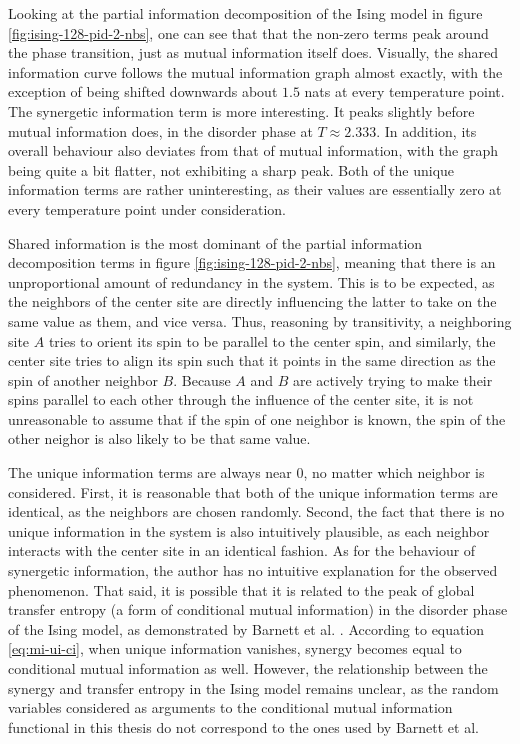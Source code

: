 \documentclass[12pt]{article}
\begin{document}
Looking at the partial information decomposition of the Ising model in figure \ref{fig:ising-128-pid-2-nbs}, one can see that that the non-zero terms peak around the phase transition, just as mutual information itself does. Visually, the shared information curve follows the mutual information graph almost exactly, with the exception of being shifted downwards about $1.5$ nats at every temperature point. The synergetic information term is more interesting. It peaks slightly before mutual information does, in the disorder phase at $T \approx 2.333$. In addition, its overall behaviour also deviates from that of mutual information, with the graph being quite a bit flatter, not exhibiting a sharp peak. Both of the unique information terms are rather uninteresting, as their values are essentially zero at every temperature point under consideration. 

Shared information is the most dominant of the partial information decomposition terms in figure \ref{fig:ising-128-pid-2-nbs}, meaning that there is an unproportional amount of redundancy in the system. This is to be expected, as the neighbors of the center site are directly influencing the latter to take on the same value as them, and vice versa. Thus, reasoning by transitivity, a neighboring site $A$ tries to orient its spin to be parallel to the center spin, and similarly, the center site tries to align its spin such that it points in the same direction as the spin of another neighbor $B$. Because $A$ and $B$ are actively trying to make their spins parallel to each other through the influence of the center site, it is not unreasonable to assume that if the spin of one neighbor is known, the spin of the other neighor is also likely to be that same value. 

The unique information terms are always near 0, no matter which neighbor is considered. First, it is reasonable that both of the unique information terms are identical, as the neighbors are chosen randomly. Second, the fact that there is no unique information in the system is also intuitively plausible, as each neighbor interacts with the center site in an identical fashion. As for the behaviour of synergetic information, the author has no intuitive explanation for the observed phenomenon. That said, it is possible that it is related to the peak of global transfer entropy (a form of conditional mutual information) in the disorder phase of the Ising model, as demonstrated by Barnett et al. \cite{barnett-ising}. According to equation \ref{eq:mi-ui-ci}, when unique information vanishes, synergy becomes equal to conditional mutual information as well. However, the relationship between the synergy and transfer entropy in the Ising model remains unclear, as the random variables considered as arguments to the conditional mutual information functional in this thesis do not correspond to the ones used by Barnett et al.
\end{document}
